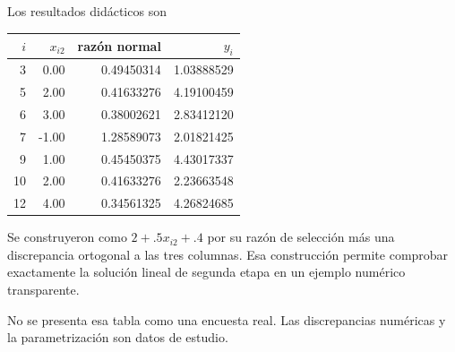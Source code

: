 \documentclass[11pt,a4paper]{article}
\begin{document}
Los resultados didácticos son
\begin{center}\small\begin{tabular}{rrrr}\toprule
\(i\)&\(x_{i2}\)&razón normal&\(y_i\)\\\midrule
3&0.00&0.49450314&1.03888529\\
5&2.00&0.41633276&4.19100459\\
6&3.00&0.38002621&2.83412120\\
7&-1.00&1.28589073&2.01821425\\
9&1.00&0.45450375&4.43017337\\
10&2.00&0.41633276&2.23663548\\
12&4.00&0.34561325&4.26824685\\\bottomrule\end{tabular}\end{center}
Se construyeron como
\(2+.5x_{i2}+.4\)
por su razón de selección
más una discrepancia
ortogonal a las tres columnas.
Esa construcción permite comprobar
exactamente la solución lineal
de segunda etapa en
un ejemplo numérico transparente.

No se presenta esa
tabla como una encuesta real.
Las discrepancias numéricas
y la parametrización
son datos de estudio.

\clearpage
\end{document}
